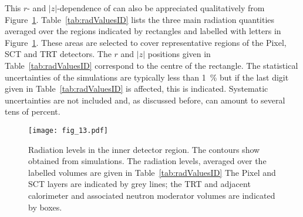 \documentclass[cernpreprint, atlasdraft=false, UKenglish,british,orcidlogo, texmf, orcidlogo]{atlasdoc}
\begin{document}
This $r$- and $|z|$-dependence of \phieqv can also be appreciated qualitatively from Figure~\ref{fig:radLevelID}.
Table~\ref{tab:radValuesID} lists the three main radiation quantities averaged over the regions indicated by
rectangles and labelled with letters in Figure~\ref{fig:radLevelID}. These areas are selected to cover
representative regions of the Pixel, \gls{SCT} and \gls{TRT} detectors. The $r$ and $|z|$ positions given in Table~\ref{tab:radValuesID}
correspond to the centre of the rectangle. The statistical uncertainties of the simulations are typically less
than \SI{1}{\percent} but if the last digit given in Table~\ref{tab:radValuesID} is affected, this is indicated.
Systematic uncertainties are not included and, as discussed before, can amount to several
tens of percent.
 
\begin{figure}
\begin{center}
\texttt{[image: fig\_13.pdf]}
\end{center}
\caption{Radiation levels in the inner detector region. The contours show \phieqv obtained from \fluka
simulations. The radiation levels, averaged over the labelled volumes are given in Table~\protect\ref{tab:radValuesID}
The Pixel and \gls{SCT} layers are indicated by grey lines; the \gls{TRT} and adjacent calorimeter and associated neutron moderator
volumes are indicated by boxes.
}
\label{fig:radLevelID}
\begin{center}


\end{center}
\end{figure}
\end{document}
